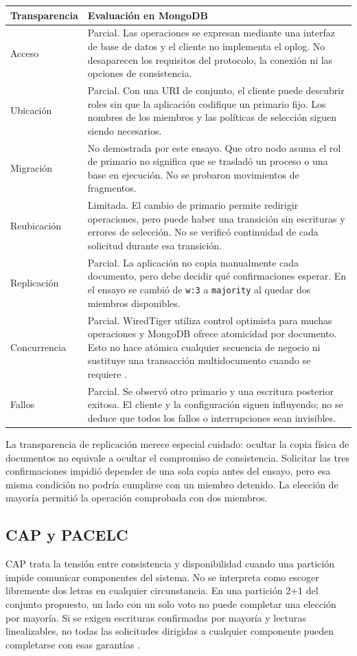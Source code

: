 \begin{longtable}{p{.19\linewidth}p{.73\linewidth}}
\toprule
\textbf{Transparencia} & \textbf{Evaluación en MongoDB} \\
\midrule
\endhead
Acceso & Parcial. Las operaciones se expresan mediante una interfaz de base de datos y el cliente no implementa el oplog. No desaparecen los requisitos del protocolo, la conexión ni las opciones de consistencia. \\
Ubicación & Parcial. Con una URI de conjunto, el cliente puede descubrir roles sin que la aplicación codifique un primario fijo. Los nombres de los miembros y las políticas de selección siguen siendo necesarios. \\
Migración & No demostrada por este ensayo. Que otro nodo asuma el rol de primario no significa que se trasladó un proceso o una base en ejecución. No se probaron movimientos de fragmentos. \\
Reubicación & Limitada. El cambio de primario permite redirigir operaciones, pero puede haber una transición sin escrituras y errores de selección. No se verificó continuidad de cada solicitud durante esa transición. \\
Replicación & Parcial. La aplicación no copia manualmente cada documento, pero debe decidir qué confirmaciones esperar. En el ensayo se cambió de \texttt{w:3} a \texttt{majority} al quedar dos miembros disponibles. \\
Concurrencia & Parcial. WiredTiger utiliza control optimista para muchas operaciones y MongoDB ofrece atomicidad por documento. Esto no hace atómica cualquier secuencia de negocio ni sustituye una transacción multidocumento cuando se requiere \cite{MongoConcurrency}. \\
Fallos & Parcial. Se observó otro primario y una escritura posterior exitosa. El cliente y la configuración siguen influyendo; no se deduce que todos los fallos o interrupciones sean invisibles. \\
\bottomrule
\end{longtable}

La transparencia de replicación merece especial cuidado: ocultar la copia física de documentos no equivale a ocultar el compromiso de consistencia. Solicitar las tres confirmaciones impidió depender de una sola copia antes del ensayo, pero esa misma condición no podría cumplirse con un miembro detenido. La elección de mayoría permitió la operación comprobada con dos miembros.

\subsection{CAP y PACELC}\label{sec:cap}
CAP trata la tensión entre consistencia y disponibilidad cuando una partición impide comunicar componentes del sistema. No se interpreta como escoger libremente dos letras en cualquier circunstancia. En una partición 2+1 del conjunto propuesto, un lado con un solo voto no puede completar una elección por mayoría. Si se exigen escrituras confirmadas por mayoría y lecturas linealizables, no todas las solicitudes dirigidas a cualquier componente pueden completarse con esas garantías \cite{MongoElections,MongoLinearizable}.

